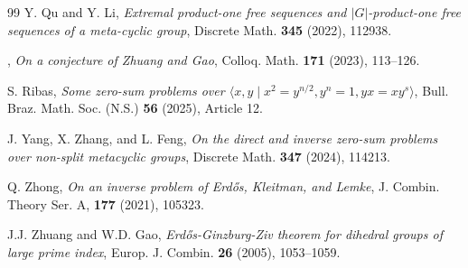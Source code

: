 \documentclass[leqno,a4paper]{amsart}
\theoremstyle{plain}
\theoremstyle{definition}
\numberwithin{equation}{section}
\begin{document}
\begin{thebibliography}{99}
		Y. Qu and Y. Li,
		{\em Extremal product-one free sequences and $|G|$-product-one free sequences of a meta-cyclic group},
		Discrete Math. \textbf{345} (2022), 112938.
		
		\bysame,
		{\em On a conjecture of Zhuang and Gao},
		Colloq. Math. \textbf{171} (2023), 113--126.
		
		S. Ribas,
		{\em Some zero-sum problems over $\langle x, y \mid x^2 = y^{n/2}, y^n = 1, yx = xy^s \rangle$},
		Bull. Braz. Math. Soc. (N.S.) \textbf{56} (2025), Article 12.

		J. Yang, X. Zhang, and L. Feng,
		{\em On the direct and inverse zero-sum problems over non-split metacyclic groups},
		Discrete Math. \textbf{347} (2024), 114213.
		
        Q. Zhong,
        {\em On an inverse problem of Erd\H{o}s, Kleitman, and Lemke},
        J. Combin. Theory Ser. A, \textbf{177} (2021), 105323.

		J.J. Zhuang and W.D. Gao,
		{\em Erd\H os-Ginzburg-Ziv theorem for dihedral groups of large prime index},
		Europ. J. Combin. \textbf{26} (2005), 1053--1059.
	\end{thebibliography}

	
		
\end{document}
